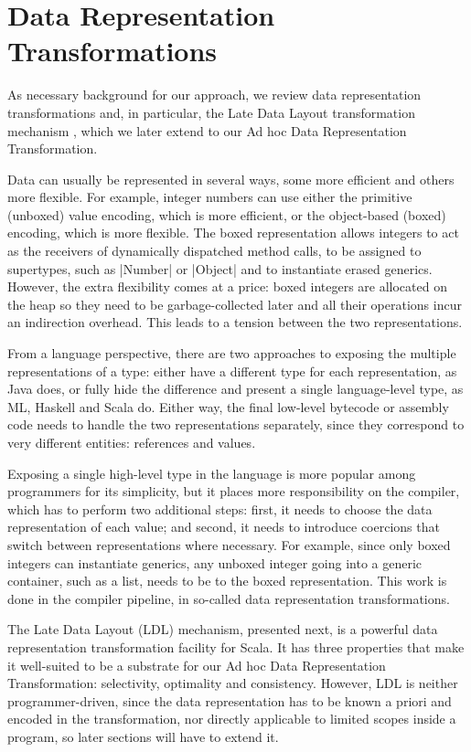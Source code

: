 

\section{Data Representation Transformations}
\label{ildl:sec:drt}

As necessary background for our approach, we review data representation transformations and, in particular, the Late Data Layout transformation mechanism \cite{ldl}, which we later extend to our Ad hoc Data Representation Transformation.

Data can usually be represented in several ways, some more efficient and others more flexible. For example, integer numbers can use either the primitive (unboxed) value encoding, which is more efficient, or the object-based (boxed) encoding, which is more flexible. The boxed representation allows integers to act as the receivers of dynamically dispatched method calls, to be assigned to supertypes, such as |Number| or |Object| and to instantiate erased generics. However, the extra flexibility comes at a price: boxed integers are allocated on the heap so they need to be garbage-collected later and all their operations incur an indirection overhead. This leads to a tension between the two representations.

From a language perspective, there are two approaches to exposing the multiple representations of a type: either have a different type for each representation, as Java does, or fully hide the difference and present a single language-level type, as ML, Haskell and Scala do. Either way, the final low-level bytecode or assembly code needs to handle the two representations separately, since they correspond to very different entities: references and values.

Exposing a single high-level type in the language is more popular among programmers for its simplicity, but it places more responsibility on the compiler, which has to perform two additional steps: first, it needs to choose the data representation of each value; and second, it needs to introduce coercions that switch between representations where necessary. For example, since only boxed integers can instantiate generics, any unboxed integer going into a generic container, such as a list, needs to be  to the boxed representation. This work is done in the compiler pipeline, in so-called data representation transformations.

The Late Data Layout (LDL) mechanism, presented next, is a powerful data
representation transformation facility for Scala.  It has three
properties that make it well-suited to be a substrate for our Ad hoc
Data Representation Transformation: selectivity, optimality and
consistency. However, LDL is neither programmer-driven, since the
data representation has to be known a priori and encoded in the
transformation, nor directly applicable to limited scopes inside a program,
so later sections will have to extend it.

